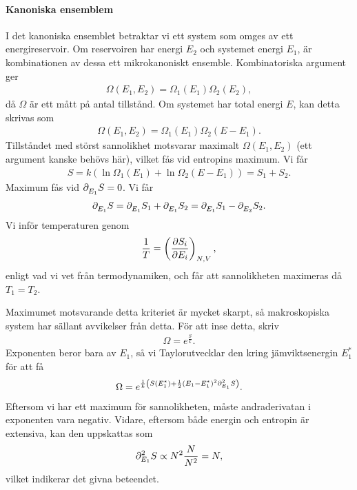 \paragraph{Kanoniska ensemblem}
I det kanoniska ensemblet betraktar vi ett system som omges av ett energireservoir. Om reservoiren har energi $E_{2}$ och systemet energi $E_{1}$, är kombinationen av dessa ett mikrokanoniskt ensemble. Kombinatoriska argument ger
\begin{align*}
	\Omega(E_{1}, E_{2}) = \Omega_{1}(E_{1})\Omega_{2}(E_{2}),
\end{align*}
då $\Omega$ är ett mått på antal tillstånd. Om systemet har total energi $E$, kan detta skrivas som
\begin{align*}
	\Omega(E_{1}, E_{2}) = \Omega_{1}(E_{1})\Omega_{2}(E - E_{1}).
\end{align*}
Tillståndet med störst sannolikhet motsvarar maximalt $\Omega(E_{1}, E_{2})$ (ett argument kanske behövs här), vilket fås vid entropins maximum. Vi får
\begin{align*}
	S = k(\ln{\Omega_{1}(E_{1})} + \ln{\Omega_{2}(E - E_{1})}) = S_{1} + S_{2}.
\end{align*}
Maximum fås vid $\del{E_{1}}{S} = 0$. Vi får
\begin{align*}
	\del{E_{1}}{S} = \del{E_{1}}{S_{1}} + \del{E_{1}}{S_{2}} = \del{E_{1}}{S_{1}} - \del{E_{2}}{S_{2}}.
\end{align*}
Vi inför temperaturen genom
\begin{align*}
	\frac{1}{T} = \left(\pdv{S_{i}}{E_{i}}\right)_{N, V},
\end{align*}
enligt vad vi vet från termodynamiken, och får att sannolikheten maximeras då $T_{1} = T_{2}$.

Maximumet motsvarande detta kriteriet är mycket skarpt, så makroskopiska system har sällant avvikelser från detta. För att inse detta, skriv
\begin{align*}
	\Omega = e^{\frac{S}{k}}.
\end{align*}
Exponenten beror bara av $E_{1}$, så vi Taylorutvecklar den kring jämviktsenergin $E_{1}^{*}$ för att få
\begin{align*}
	\Omega = e^{\frac{1}{k}\left(S(E_{1}^{*}) + \frac{1}{2}(E_{1} - E_{1}^{*})^{2}\del[2]{E_{1}}{S}\right)}.
\end{align*}
Eftersom vi har ett maximum för sannolikheten, måste andraderivatan i exponenten vara negativ. Vidare, eftersom både energin och entropin är extensiva, kan den uppskattas som
\begin{align*}
	\del[2]{E_{1}}{S}\propto N^{2}\frac{N}{N^{2}} = N,
\end{align*}
vilket indikerar det givna beteendet.


